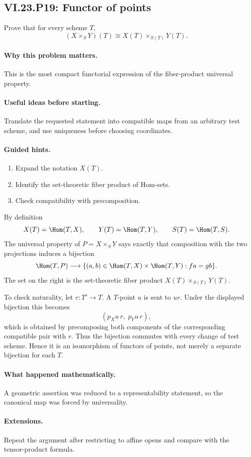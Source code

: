 \subsection*{VI.23.P19: Functor of points}
\begin{problem}\label{prob:vi23-p19}
Prove that for every scheme $T$,
\[
(X\times_SY)(T)\cong X(T)\times_{S(T)}Y(T).
\]
\end{problem}

\ifdefined\FullProblemDossiers
\paragraph{Why this problem matters.}
This is the most compact functorial expression of the fiber-product universal property.

\paragraph{Useful ideas before starting.}
Translate the requested statement into compatible maps from an arbitrary test scheme, and use uniqueness before choosing coordinates.

\paragraph{Guided hints.}
\begin{enumerate}
\item Expand the notation $X(T)$.
\item Identify the set-theoretic fiber product of Hom-sets.
\item Check compatibility with precomposition.
\end{enumerate}

\begin{solution}
By definition
\[
X(T)=\Hom(T,X),\qquad Y(T)=\Hom(T,Y),\qquad S(T)=\Hom(T,S).
\]
The universal property of $P=X\times_SY$ says exactly that composition with the two projections
induces a bijection
\[
\Hom(T,P)
\longrightarrow
\{(a,b)\in\Hom(T,X)\times\Hom(T,Y):fa=gb\}.
\]
The set on the right is the set-theoretic fiber product
$X(T)\times_{S(T)}Y(T)$.

To check naturality, let $r:T'\to T$.  A $T$-point $u$ is sent to $u r$.  Under the displayed
bijection this becomes
\[
(p_Xu\,r,\;p_Yu\,r),
\]
which is obtained by precomposing both components of the corresponding compatible pair with $r$.
Thus the bijection commutes with every change of test scheme.  Hence it is an isomorphism of
functors of points, not merely a separate bijection for each $T$.
\end{solution}

\paragraph{What happened mathematically.}
A geometric assertion was reduced to a representability statement, so the canonical map was forced by universality.

\paragraph{Extensions.}
Repeat the argument after restricting to affine opens and compare with the tensor-product formula.
\fi
